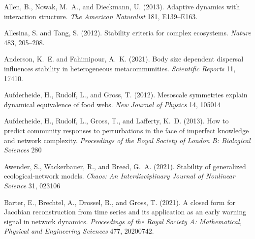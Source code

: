 \documentclass{article}
\begin{document}
\begin{thebibliography}{85}
Allen, B., Nowak, M.~A., and Dieckmann, U. (2013).
\newblock Adaptive dynamics with interaction structure.
\newblock \emph{The American Naturalist} 181, E139--E163.
\newblock {}

Allesina, S. and Tang, S. (2012).
\newblock Stability criteria for complex ecosystems.
\newblock \emph{Nature} 483, 205--208.
\newblock {}

Anderson, K.~E. and Fahimipour, A.~K. (2021).
\newblock Body size dependent dispersal influences stability in heterogeneous
  metacommunities.
\newblock \emph{Scientific Reports} 11, 17410.
\newblock {}

Aufderheide, H., Rudolf, L., and Gross, T. (2012).
\newblock Mesoscale symmetries explain dynamical equivalence of food webs.
\newblock \emph{New Journal of Physics} 14, 105014

Aufderheide, H., Rudolf, L., Gross, T., and Lafferty, K.~D. (2013).
\newblock How to predict community responses to perturbations in the face of
  imperfect knowledge and network complexity.
\newblock \emph{Proceedings of the Royal Society of London B: Biological
  Sciences} 280

Awender, S., Wackerbauer, R., and Breed, G.~A. (2021).
\newblock Stability of generalized ecological-network models.
\newblock \emph{Chaos: An Interdisciplinary Journal of Nonlinear Science} 31,
  023106

Barter, E., Brechtel, A., Drossel, B., and Gross, T. (2021).
\newblock A closed form for Jacobian reconstruction from time series and its
  application as an early warning signal in network dynamics.
\newblock \emph{Proceedings of the Royal Society A: Mathematical, Physical and
  Engineering Sciences} 477, 20200742.
\newblock {}


\end{thebibliography}
\end{document}

